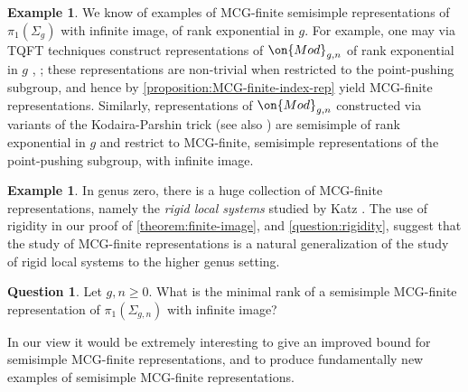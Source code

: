 \documentclass[12 pt]{amsart}
\theoremstyle{plain}
\theoremstyle{definition}
\newtheorem{example}[subsubsection]{Example}
\newtheorem{question}[subsubsection]{Question}
\theoremstyle{remark}
\numberwithin{equation}{section}
\begin{document}
\begin{example}
	\label{example:semisimple-bound}
We know of examples of MCG-finite
semisimple representations of $\pi_1(\Sigma_g)$ with infinite image, of rank exponential in $g$. For example, one may via TQFT techniques construct representations of $\on{Mod}_{g,n}$
of rank exponential in $g$
\cite[Corollary 4.3]{koberda2016quotients}, \cite[Theorem 5.1]{biswas2018representations}; 
these representations are non-trivial when restricted to the point-pushing subgroup, and hence by \autoref{proposition:MCG-finite-index-rep} yield MCG-finite representations.
Similarly, representations of $\on{Mod}_{g,n}$ constructed via variants of
the Kodaira-Parshin trick 
\cite[Example 3.3.1]{lawrence2019representations}
(see also \cite[Proposition 5.1.1 and Remark 5.1.2]{LL:geometric-local-systems})
are semisimple of rank exponential in $g$ and restrict to 
MCG-finite, semisimple representations of the point-pushing subgroup, with infinite image. 
\end{example}

\begin{example}
	In genus zero, there is a huge collection of MCG-finite representations, namely the \emph{rigid local systems} studied by Katz \cite{katz2016rigid}. The use of rigidity in our proof of \autoref{theorem:finite-image}, and \autoref{question:rigidity}, suggest that the study of MCG-finite representations is a natural generalization  of the study of rigid local systems to the higher genus setting. 
\end{example}

\begin{question}
Let $g, n\geq 0$. What is the minimal rank of a semisimple MCG-finite representation of $\pi_1(\Sigma_{g,n})$ with infinite image?
\end{question}

In our view it would be extremely interesting to give an improved bound for semisimple MCG-finite representations, and to produce fundamentally new examples of semisimple MCG-finite representations.
\end{document}
